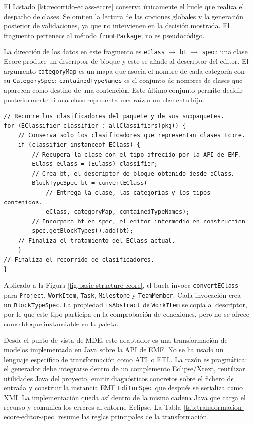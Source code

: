 El Listado \ref{lst:recorrido-eclass-ecore} conserva únicamente el bucle que
realiza el despacho de clases. Se omiten la lectura de las opciones globales y
la generación posterior de validaciones, ya que no intervienen en la decisión
mostrada. El fragmento pertenece al método \texttt{fromEPackage}; no es
pseudocódigo.

La dirección de los datos en este fragmento es
\texttt{eClass} $\rightarrow$ \texttt{bt} $\rightarrow$ \texttt{spec}: una clase
Ecore produce un descriptor de bloque y este se añade al descriptor del editor.
El argumento \texttt{categoryMap} es un mapa que asocia el nombre de cada
categoría con su \texttt{CategorySpec}; \texttt{containedTypeNames} es el conjunto
de nombres de clases que aparecen como destino de una contención. Este último
conjunto permite decidir posteriormente si una clase representa una raíz o un
elemento hijo.

\begin{lstlisting}[float=htbp, style=tfmjavaecore, captionpos=t, caption={Fragmento comentado del recorrido de clases Ecore}, label={lst:recorrido-eclass-ecore}]
// Recorre los clasificadores del paquete y de sus subpaquetes.
for (EClassifier classifier : allClassifiers(pkg)) {
    // Conserva solo los clasificadores que representan clases Ecore.
    if (classifier instanceof EClass) {
        // Recupera la clase con el tipo ofrecido por la API de EMF.
        EClass eClass = (EClass) classifier;
        // Crea bt, el descriptor de bloque obtenido desde eClass.
        BlockTypeSpec bt = convertEClass(
            // Entrega la clase, las categorias y los tipos contenidos.
            eClass, categoryMap, containedTypeNames);
        // Incorpora bt en spec, el editor intermedio en construccion.
        spec.getBlockTypes().add(bt);
    // Finaliza el tratamiento del EClass actual.
    }
// Finaliza el recorrido de clasificadores.
}
\end{lstlisting}
\FloatBarrier

Aplicado a la Figura \ref{fig:basic-structure-ecore}, el bucle invoca
\texttt{convertEClass} para \texttt{Project}, \texttt{WorkItem}, \texttt{Task},
\texttt{Milestone} y \texttt{TeamMember}. Cada invocación crea un
\texttt{BlockTypeSpec}.
La propiedad \texttt{isAbstract} de \texttt{WorkItem} se copia al descriptor,
por lo que este tipo participa en la comprobación de conexiones, pero no se
ofrece como bloque instanciable en la paleta.

Desde el punto de vista de MDE, este adaptador es una transformación de modelos
implementada en Java sobre la API de EMF. No se ha usado un lenguaje específico
de transformación como ATL o ETL. La razón es pragmática: el generador debe
integrarse dentro de un complemento Eclipse/Xtext, reutilizar utilidades Java del
proyecto, emitir diagnósticos concretos sobre el fichero de entrada y construir
la instancia EMF \texttt{EditorSpec} que después se serializa como XMI. La
implementación queda así dentro de la misma cadena Java que carga el recurso y
comunica los errores al entorno Eclipse. La Tabla
\ref{tab:transformacion-ecore-editor-spec} resume las reglas principales de la
transformación.

